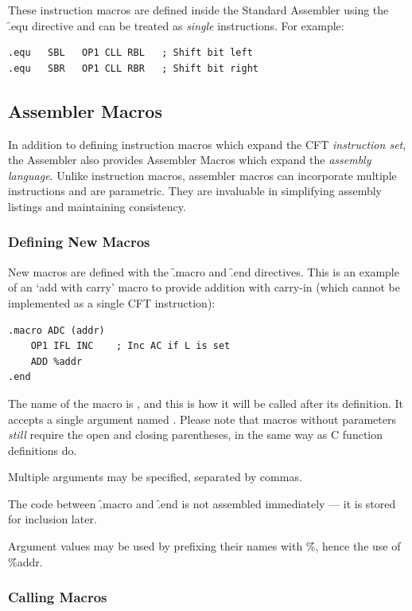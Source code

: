 These instruction macros are defined inside the Standard Assembler using the
\f{.equ} directive and can be treated as {\em single} instructions. For example:

\begin{lstlisting}[language=cftasm]
.equ   SBL   OP1 CLL RBL   ; Shift bit left
.equ   SBR   OP1 CLL RBR   ; Shift bit right
\end{lstlisting}



\subsection{Assembler Macros}

In addition to defining instruction macros which expand the CFT {\em
  instruction set}, the Assembler also provides Assembler Macros which expand
the {\em assembly language}. Unlike instruction macros, assembler macros can
incorporate multiple instructions and are parametric. They are invaluable in
simplifying assembly listings and maintaining consistency.

\subsubsection{Defining New Macros}

New macros are defined with the \f{.macro} and \f{.end} directives. This is an
example of an ‘add with carry’ macro to provide addition with carry-in (which
cannot be implemented as a single CFT instruction):

\begin{lstlisting}[language=cftasm]
.macro ADC (addr)
    OP1 IFL INC    ; Inc AC if L is set
    ADD %addr
.end
\end{lstlisting}

The name of the macro is , and this is how it will be called after its
definition. It accepts a single argument named . Please note that
macros without parameters {\em still} require the open and closing parentheses,
in the same way as C function definitions do.

Multiple arguments may be specified, separated by commas.

The code between \f{.macro} and \f{.end} is not assembled immediately — it is
stored for inclusion later.

Argument values may be used by prefixing their names with \f{\%}, hence the use
of \f{\%addr}.

\subsubsection{Calling Macros}

